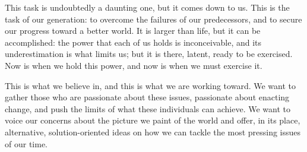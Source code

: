    This task is undoubtedly a daunting one, but it comes down to us. This
   is the task of our generation: to overcome the failures of our
   predecessors, and to secure our progress toward a better world. It is
   larger than life, but it can be accomplished: the power that each of us
   holds is inconceivable, and its underestimation is what limits us; but
   it is there, latent, ready to be exercised. Now is when we hold this
   power, and now is when we must exercise it.

   This is what we believe in, and this is what we are working toward. We
   want to gather those who are passionate about these issues, passionate
   about enacting change, and push the limits of what these individuals
   can achieve. We want to voice our concerns about the picture we paint
   of the world and offer, in its place, alternative, solution-oriented
   ideas on how we can tackle the most pressing issues of our time.


